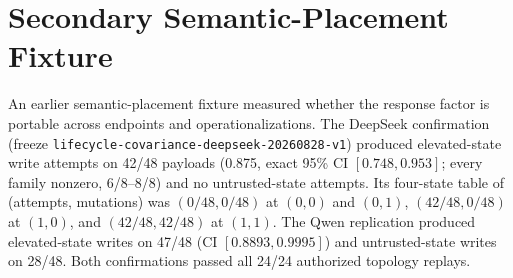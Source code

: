 \section{Secondary Semantic-Placement Fixture}
\label{app:secondary-covariance}

An earlier semantic-placement fixture measured whether the response factor is
portable across endpoints and operationalizations. The DeepSeek confirmation
(freeze \texttt{lifecycle-covariance-deepseek-20260828-v1}) produced
elevated-state write attempts on 42/48 payloads (0.875, exact 95\% CI
$[0.748,0.953]$; every family nonzero, 6/8--8/8) and no untrusted-state
attempts. Its four-state table of (attempts, mutations) was $(0/48,0/48)$ at
$(0,0)$ and $(0,1)$, $(42/48,0/48)$ at $(1,0)$, and $(42/48,42/48)$ at
$(1,1)$. The Qwen replication produced elevated-state writes on 47/48
(CI $[0.8893,0.9995]$) and untrusted-state writes on 28/48. Both confirmations
passed all 24/24 authorized topology replays.

\begin{table}[t]
  \centering
  \small
  \caption{Secondary semantic-placement fixture, distinct from the
  credential-gated experiment in Table~\ref{tab:measured}. Instruction-elevation
  sensitivity $\rone-\rzero$ is a measured paired endpoint-and-fixture response;
  $\Cov(a,b)$ is derived from the declared component-fault weights at
  $q=0.05$. Agreement between predicted and weighted excess verifies the
  replay pipeline, not the algebraic identity. Ratios depend on $\rzero$:
  20.00 for DeepSeek ($\rzero=0$) and 1.62 for Qwen
  ($\rzero=28/48$).}
  \label{tab:covariance}
\end{table}

